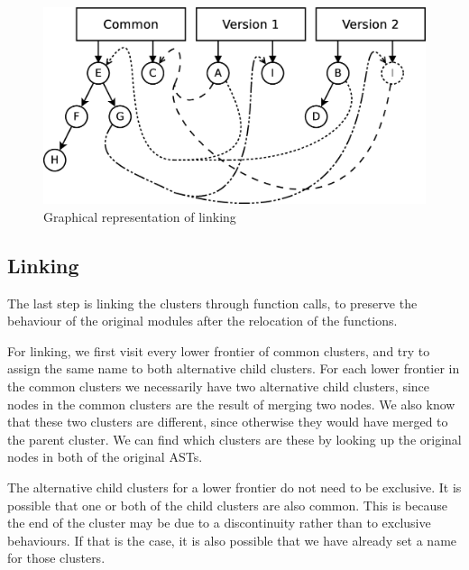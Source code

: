 \begin{figure}
\begin{centering}
\includegraphics[width=1\textwidth]{figures/automatic_beh_inf/diagrams/dia5}
\par\end{centering}

\caption{Graphical representation of linking\label{fig:cluster-linking-example}}


\end{figure}



\subsection{Linking}

The last step is linking the clusters through function calls, to preserve
the behaviour of the original modules after the relocation of the
functions.

For linking, we first visit every lower frontier of common clusters,
and try to assign the same name to both alternative child clusters.
For each lower frontier in the common clusters we necessarily have
two alternative child clusters, since nodes in the common clusters
are the result of merging two nodes. We also know that these two clusters
are different, since otherwise they would have merged to the parent
cluster. We can find which clusters are these by looking up the original
nodes in both of the original ASTs.

The alternative child clusters for a lower frontier do not need to
be exclusive. It is possible that one or both of the child clusters
are also common. This is because the end of the cluster may be due
to a discontinuity rather than to exclusive behaviours. If that is
the case, it is also possible that we have already set a name for
those clusters.

